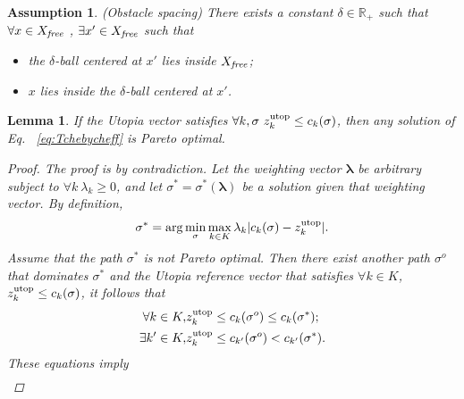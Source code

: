 \documentclass{article}
\newtheorem{lem}{Lemma}
\newtheorem{asmp}{Assumption}
\begin{document}
\begin{asmp}{(Obstacle spacing)}
\label{asmp:spacing}
There exists a constant $ \delta \in \mathbb{R}_{+} $ such that $ \forall x \in X_{\it free} $ , $ \exists x' \in X_{\it free} $ such that
\begin{itemize}
\item the $ \delta $-ball centered at $ x' $ lies inside $ X_{\it free} $;
\item $ x $ lies inside the $ \delta $-ball centered at $ x' $.
\end{itemize}
\end{asmp}


\begin{lem}
\label{lem:sol_pareto_opt}
If the Utopia vector satisfies $\forall k,\sigma\  z_k^{\rm utop}\leq c_{k}( \sigma)$, then any solution of Eq.~ \eqref{eq:Tchebycheff} is Pareto optimal.
\begin{proof}
The proof is by contradiction.  
Let the weighting vector ${\mathbf \lambda}$ be arbitrary subject to $\forall k\ \lambda_k\geq 0$, and let $ \sigma^*=\sigma^{*}({\mathbf \lambda}) $ be a solution given that weighting vector. 
By definition, 
\begin{equation}
\label{eq:tchebycheff:argmin}
\sigma^{*} = \arg \min_{ \sigma } \max_{ k \in K }  \lambda_{k} | c_{k}( \sigma ) - z^{\rm utop}_{k} | .
\end{equation}
Assume that the path $ \sigma^{*} $ is not Pareto optimal.
Then there exist another path $ \sigma^{o} $ that dominates $ \sigma^{*} $
and the Utopia reference vector that satisfies
$ \forall k \in K $, $ z^{\rm utop}_{k} \leq  c_{k}( \sigma ) $, it follows that
\begin{eqnarray}
\nonumber
\forall k \in K , & z^{\rm utop}_{k} \leq c_{k}( \sigma^{o} ) \leq c_{k}( \sigma^{*} ) ; \\
\nonumber
\exists k' \in K , & z^{\rm utop}_{k} \leq c_{k'}( \sigma^{o} ) < c_{k'}( \sigma^{*} ).
\end{eqnarray}
These equations imply
\begin{eqnarray}

\end{eqnarray}
\end{proof}
\end{lem}
\end{document}
